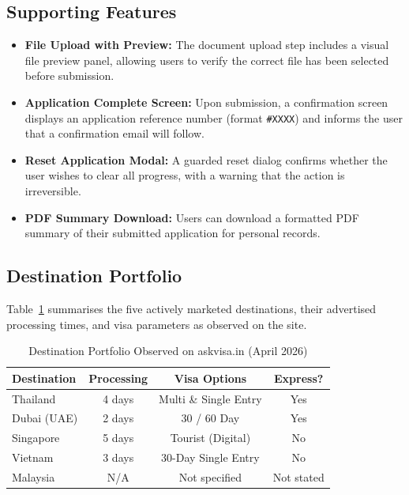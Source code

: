 \documentclass[journal, 10pt, twoside]{IEEEtran}
\begin{document}
\subsection{Supporting Features}
\begin{itemize}
  \item \textbf{File Upload with Preview:} The document upload step
  includes a visual file preview panel, allowing users to verify the
  correct file has been selected before submission.
  \item \textbf{Application Complete Screen:} Upon submission, a
  confirmation screen displays an application reference number (format
  \texttt{\#XXXX}) and informs the user that a confirmation email will
  follow.
  \item \textbf{Reset Application Modal:} A guarded reset dialog confirms
  whether the user wishes to clear all progress, with a warning that the
  action is irreversible.
  \item \textbf{PDF Summary Download:} Users can download a formatted
  PDF summary of their submitted application for personal records.
\end{itemize}

\subsection{Destination Portfolio}
Table~\ref{tab:destinations} summarises the five actively marketed
destinations, their advertised processing times, and visa parameters as
observed on the site.

\begin{table}[ht]
  \centering
  \caption{Destination Portfolio Observed on askvisa.in (April 2026)}
  \label{tab:destinations}
  \begin{tabular}{@{}lccc@{}}
    \toprule
    \textbf{Destination} & \textbf{Processing} & \textbf{Visa Options}
    & \textbf{Express?} \\
    \midrule
    Thailand  & 4 days & Multi \& Single Entry & Yes \\
    Dubai (UAE) & 2 days & 30 / 60 Day & Yes \\
    Singapore & 5 days & Tourist (Digital) & No \\
    Vietnam   & 3 days & 30-Day Single Entry & No \\
    Malaysia  & N/A    & Not specified        & Not stated \\
    \bottomrule
  \end{tabular}
\end{table}
\end{document}
